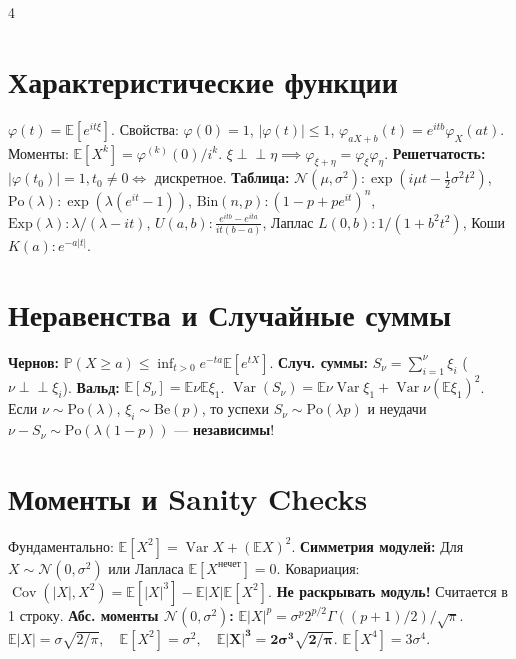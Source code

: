 \documentclass[8pt, a4paper, landscape]{extarticle}
\newcommand{\E}{\mathbb{E}}
\renewcommand{\P}{\mathbb{P}}
\newcommand{\N}{\mathcal{N}}
\DeclareMathOperator{\Var}{Var}
\DeclareMathOperator{\Cov}{Cov}
\begin{document}
\begin{multicols*}{4}
\section*{Характеристические функции}
$\varphi(t) = \E[e^{it\xi}]$. Свойства: $\varphi(0)=1$, $|\varphi(t)| \le 1$, $\varphi_{aX+b}(t) = e^{itb}\varphi_X(at)$. Моменты: $\E[X^k] = \varphi^{(k)}(0) / i^k$.
$\xi \perp\!\!\perp \eta \implies \varphi_{\xi+\eta} = \varphi_\xi \varphi_\eta$. \textbf{Решетчатость:} $|\varphi(t_0)|=1, t_0 \ne 0 \iff$ дискретное.
\textbf{Таблица:} $\N(\mu,\sigma^2): \exp(i\mu t - \frac{1}{2}\sigma^2 t^2)$, $\text{Po}(\lambda): \exp(\lambda(e^{it}-1))$, $\text{Bin}(n,p): (1-p+pe^{it})^n$, $\text{Exp}(\lambda): \lambda / (\lambda-it)$, $U(a,b): \frac{e^{itb}-e^{ita}}{it(b-a)}$, Лаплас $L(0,b): 1 / (1+b^2 t^2)$, Коши $K(a): e^{-a|t|}$.

\section*{Неравенства и Случайные суммы}
\textbf{Чернов:} $\P(X \ge a) \le \inf_{t>0} e^{-ta}\E[e^{tX}]$.
\textbf{Случ. суммы:} $S_\nu = \sum_{i=1}^\nu \xi_i$ ($\nu \perp\!\!\perp \xi_i$).
\textbf{Вальд:} $\E[S_\nu] \!=\! \E\nu\E\xi_1$. $\Var(S_\nu) \!=\! \E\nu\Var\xi_1 \!+\! \Var\nu(\E\xi_1)^2$.
Если $\nu \sim \text{Po}(\lambda)$, $\xi_i \sim \text{Be}(p)$, то успехи $S_\nu \sim \text{Po}(\lambda p)$ и неудачи $\nu-S_\nu \sim \text{Po}(\lambda(1-p))$ --- \textbf{независимы}!

\section*{Моменты и Sanity Checks}
Фундаментально: $\E[X^2] = \Var X + (\E X)^2$. 
\textbf{Симметрия модулей:} Для $X \sim \N(0, \sigma^2)$ или Лапласа $\E[X^{\text{нечет}}]=0$. Ковариация: $\Cov(|X|, X^2) = \E[|X|^3] - \E|X|\E[X^2]$. \textbf{Не раскрывать модуль!} Считается в 1 строку.
\textbf{Абс. моменты $\N(0, \sigma^2)$:} $\E|X|^p \!=\! \sigma^p 2^{p/2} \Gamma((p+1)/2)/\sqrt{\pi}$.
$\E|X| = \sigma \sqrt{2/\pi}, \quad \E[X^2]=\sigma^2, \quad \mathbf{\E|X|^3 = 2\sigma^3 \sqrt{2/\pi}}$. $\E[X^4]=3\sigma^4$.


\end{multicols*}
\end{document}
